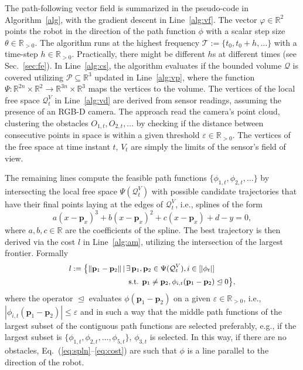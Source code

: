\documentclass[lettersize,journal,twoside]{IEEEtran}
\theoremstyle{definition}
\begin{document}
The path-following vector field is summarized in the pseudo-code in Algorithm~\ref{alg}, with the gradient descent in Line~\ref{alg:vf}. The vector $\varphi\in\mathbb{R}^2$ points the robot in the direction of the path function $\phi$ with a scalar step size $\theta\in\mathbb{R}_{>0}$. The algorithm runs at the highest frequency $\mathcal{T}:=\{t_0,t_0+h,\dots\}$ with a time-step $h\in\mathbb{R}_{>0}$. Practically, there might be different $h$s at different times (see Sec.~\ref{sec:fe}). In Line~\ref{alg:cs}, the algorithm evaluates if the bounded volume $\mathcal{Q}$ is covered utilizing $\mathcal{P}\subseteq\mathbb{R}^3$ updated in Line~\ref{alg:vp}, where the function $\Psi:\mathbb{R}^{2n}\times\mathbb{R}^2\rightarrow\mathbb{R}^{3n}\times\mathbb{R}^3$ maps the vertices to the volume. The vertices of the local free space $\mathcal{Q}^V_t$ in Line~\ref{alg:vd} are derived from sensor readings, assuming the presence of an RGB-D camera. The %
approach read the camera's point cloud, clustering the obstacles $O_{1,t},O_{2,t},\dots$ by checking if the distance between consecutive points in space is within a given threshold $\varepsilon\in\mathbb{R}_{>0}$. The vertices of the free space at time instant $t$, $V_t$ are simply the limits of the sensor's field of view.

The remaining lines %
compute the feasible path functions $\{\phi_{1,t},\phi_{2,t},\dots\}$ by intersecting the local free space $\Psi(\mathcal{Q}^V_t)$ with possible candidate trajectories that have their final points laying at the edges of $\mathcal{Q}^V_t$, i.e., splines of the form
\begin{equation}\label{eq:spln}
  a(x-\mathbf{p}_x)^3+b(x-\mathbf{p}_x)^2+c(x-\mathbf{p}_x)+d-y=0,
\end{equation}
where $a,b,c\in\mathbb{R}$ are the coefficients of the spline. 
The best trajectory is then derived via the cost $l$ in Line~\ref{alg:am}, utilizing the intersection of the largest frontier. Formally
\begin{equation}\label{eq:cost}\small\begin{split} 
  l:=\bigl\{\lVert \mathbf{p}_1-\mathbf{p}_2\rVert\,|\,&\exists\,\mathbf{p}_1,\mathbf{p}_2\in\Psi(\mathcal{Q}_t^V),i\in[|\phi_t|]\\
  &\text{ s.t. }\mathbf{p}_1\neq\mathbf{p}_2,\phi_{i,t}(\mathbf{p}_1-\mathbf{p}_2)\trianglelefteq 0\bigr\},
\end{split}\end{equation}
where the operator $\trianglelefteq$ evaluates $\phi(\mathbf{p}_1-\mathbf{p}_2)$ on a given $\varepsilon\in\mathbb{R}_{>0}$, i.e., $|\phi_{i,t}(\mathbf{p}_1-\mathbf{p}_2)|\leq\varepsilon$ and in such a way that the middle path functions of the largest subset of the contiguous path functions are selected preferably, e.g., if the largest subset is $\{\phi_{1,t},\phi_{2,t},\dots,\phi_{5,t}\}$, $\phi_{3,t}$ is selected.
In this way, if there are no obstacles, Eq.~(\ref{eq:spln}--\ref{eq:cost}) are such that $\phi$ is a line parallel to the direction of the robot. 
\end{document}
